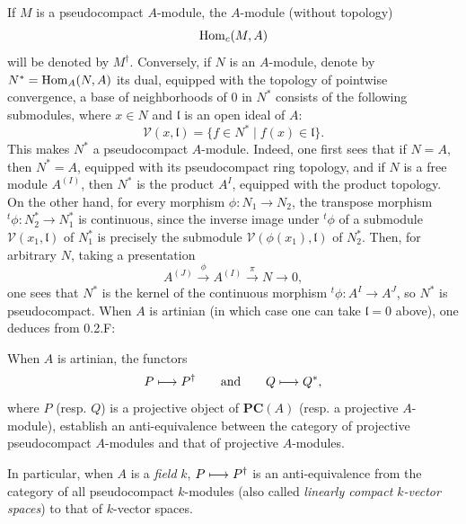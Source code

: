 If $M$ is a pseudocompact $A$-module, the $A$-module (without topology)
\[
\operatorname{Hom}_c(M,A)
\]
will be denoted by $M^\dagger$.
Conversely, if $N$ is an $A$-module, denote by $N^*=\operatorname{Hom}_A(N,A)$ its dual, equipped with the topology of pointwise convergence, \ie a base of neighborhoods of $0$ in $N^*$ consists of the following submodules, where $x\in N$ and $\mathfrak l$ is an open ideal of $A$:
\[
\mathcal V(x,\mathfrak l)=\{f\in N^*\mid f(x)\in\mathfrak l\}.
\]
This makes $N^*$ a pseudocompact $A$-module. Indeed, one first sees that if $N=A$, then $N^*=A$, equipped with its pseudocompact ring topology, and if $N$ is a free module $A^{(I)}$, then $N^*$ is the product $A^I$, equipped with the product topology. On the other hand, for every morphism $\phi:N_1\to N_2$, the transpose morphism ${}^t\phi:N_2^*\to N_1^*$ is continuous, since the inverse image under ${}^t\phi$ of a submodule $\mathcal V(x_1,\mathfrak l)$ of $N_1^*$ is precisely the submodule $\mathcal V(\phi(x_1),\mathfrak l)$ of $N_2^*$. Then, for arbitrary $N$, taking a presentation
\[
A^{(J)}\xrightarrow{\phi}A^{(I)}\xrightarrow{\pi}N\to0,
\]
one sees that $N^*$ is the kernel of the continuous morphism ${}^t\phi:A^I\to A^J$, so $N^*$ is pseudocompact.
When $A$ is artinian (in which case one can take $\mathfrak l=0$ above), one deduces from 0.2.F:
\begin{proposition}{}
When $A$ is artinian, the functors
\[
P\longmapsto P^\dagger\qquad\text{and}\qquad Q\longmapsto Q^*,
\]
where $P$ (resp. $Q$) is a projective object of $\mathbf{PC}(A)$ (resp. a projective $A$-module), establish an anti-equivalence between the category of projective pseudocompact $A$-modules and that of projective $A$-modules.
\end{proposition}
In particular, when $A$ is a \emph{field} $k$, $P\longmapsto P^\dagger$ is an anti-equivalence from the category of all pseudocompact $k$-modules (also called \emph{linearly compact $k$-vector spaces}) to that of $k$-vector spaces.

